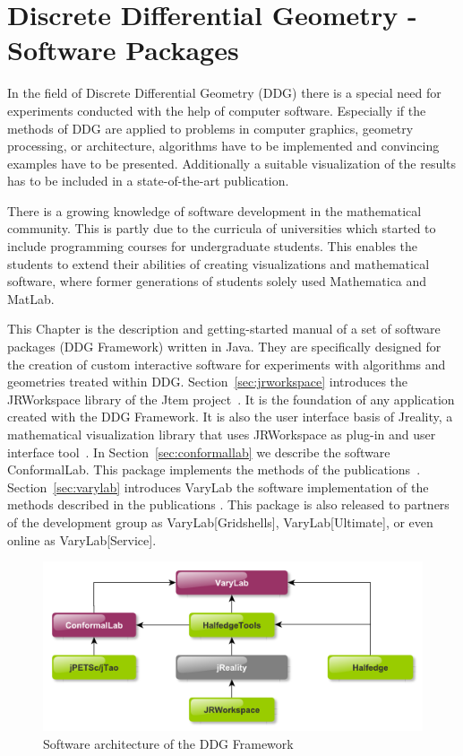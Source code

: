 \chapter{Discrete Differential Geometry - Software Packages}

In the field of Discrete Differential Geometry (DDG) there is a special need for experiments
conducted with the help of computer software. Especially if the methods of DDG are applied
to problems in computer graphics, geometry processing, or architecture, algorithms have 
to be implemented and convincing examples have to be presented. Additionally a suitable 
visualization of the results has to be included in a state-of-the-art publication.

There is a growing knowledge of software development in the mathematical community. This 
is partly due to the curricula of universities which started to include programming courses for undergraduate students.
This enables the students to extend their abilities of creating visualizations and mathematical software, where former generations of students solely used Mathematica and MatLab.

This Chapter is the description and getting-started manual of a set of software packages
(DDG Framework) written in Java. They are specifically designed for the creation of custom interactive software
for experiments with algorithms and geometries treated within DDG. 
Section~\ref{sec:jrworkspace} introduces the {\sc JRWorkspace} library of the {\sc Jtem} project~\cite{JtemWebsite}.
It is the foundation of any application created with the DDG Framework. It is also the user interface basis of {\sc Jreality}, a mathematical visualization library that uses {\sc JRWorkspace} as plug-in and user interface tool~\cite{JrealityWebsite}. In Section~\ref{sec:conformallab} we describe the software {\sc ConformalLab}. This package
implements the methods of the publications~\cite{Bobenko2010, OWR2012, Sechelmann2012, BobSechSpr}.
Section~\ref{sec:varylab} introduces {\sc VaryLab} the software implementation of the methods described in the publications \cite{Lafuente2011, Lafuente2012, Sechelmann2012}.
This package is also released to partners of the development group as {\sc VaryLab[Gridshells]}, {\sc VaryLab[Ultimate]}, or even online as {\sc VaryLab[Service]}.

\begin{figure}
	\includegraphics[width=\linewidth]{figures/software_architecture}
	\caption{Software architecture of the DDG Framework}
	\label{fig:software_architecture}
\end{figure}

